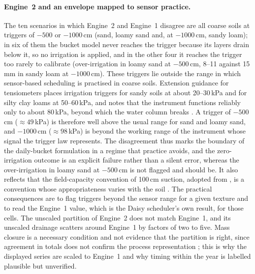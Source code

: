 \paragraph{Engine~2 and an envelope mapped to sensor practice.} The ten scenarios in which Engine~2 and Engine~1 disagree are all coarse soils at triggers of $-500$ or $-1000$\,cm (sand, loamy sand and, at $-1000$\,cm, sandy loam); in six of them the bucket model never reaches the trigger because its layers drain below it, so no irrigation is applied, and in the other four it reaches the trigger too rarely to calibrate (over-irrigation in loamy sand at $-500$\,cm, 8--11 against 15\,mm in sandy loam at $-1000$\,cm). These triggers lie outside the range in which sensor-based scheduling is practised in coarse soils. Extension guidance for tensiometers places irrigation triggers for sandy soils at about 20--30\,kPa and for silty clay loams at 50--60\,kPa, and notes that the instrument functions reliably only to about 80\,kPa, beyond which the water column breaks \citep{Alam1997}. A trigger of $-500$\,cm ($\approx49$\,kPa) is therefore well above the usual range for sand and loamy sand, and $-1000$\,cm ($\approx98$\,kPa) is beyond the working range of the instrument whose signal the trigger law represents. The disagreement thus marks the boundary of the daily-bucket formulation in a regime that practice avoids, and the zero-irrigation outcome is an explicit failure rather than a silent error, whereas the over-irrigation in loamy sand at $-500$\,cm is not flagged and should be. It also reflects that the field-capacity convention of 100\,cm suction, adopted from \citet{Allen1998}, is a convention whose appropriateness varies with the soil \citep{Twarakavi2009,Assouline2014}. The practical consequences are to flag triggers beyond the sensor range for a given texture and to read the Engine~1 value, which is the Daisy scheduler's own result, for those cells. The unscaled partition of Engine~2 does not match Engine~1, and its unscaled drainage scatters around Engine~1 by factors of two to five. Mass closure is a necessary condition and not evidence that the partition is right, since agreement in totals does not confirm the process representation \citep{Oreskes1994}; this is why the displayed series are scaled to Engine~1 and why timing within the year is labelled plausible but unverified.

